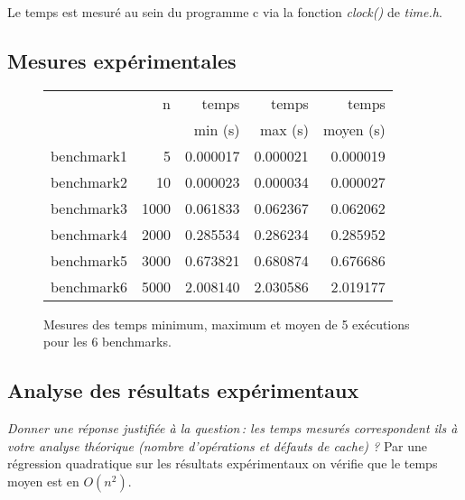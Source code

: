 \documentclass[a4paper, 10pt, french]{article}
\begin{document}
    Le temps est mesuré au sein du programme c via la fonction \emph{clock()} de \textit{time.h}.

  \subsection{Mesures expérimentales}

    \begin{figure}[h]
      \begin{center}
        \begin{tabular}{|l||r||r|r|r||}
          \hline
          \hline
            & n			& temps     & temps   & temps \\
            &			& min (s)   & max (s) & moyen (s)\\
          \hline
          \hline
            benchmark1 & 5 & 0.000017 & 0.000021 & 0.000019 \\
          \hline
            benchmark2 & 10 & 0.000023 & 0.000034 & 0.000027 \\
          \hline
            benchmark3 & 1000 & 0.061833 & 0.062367 & 0.062062 \\
          \hline
            benchmark4 & 2000 & 0.285534 & 0.286234 & 0.285952 \\
          \hline
            benchmark5 & 3000 & 0.673821 & 0.680874 & 0.676686 \\
          \hline
            benchmark6 & 5000 & 2.008140 & 2.030586 & 2.019177 \\
          \hline
          \hline
        \end{tabular}
        \caption{Mesures des temps minimum, maximum et moyen de 5 exécutions pour les 6 benchmarks.}
        \label{table-temps}
      \end{center}
    \end{figure}

\subsection{Analyse des résultats expérimentaux}
{\em Donner  une réponse justifiée  à la question\,: 
              les  temps mesurés correspondent ils  à votre analyse théorique (nombre d’opérations et défauts de cache) ?
}
Par une régression quadratique sur les résultats expérimentaux on vérifie que le temps moyen est en $O(n^2)$.
\end{document}
